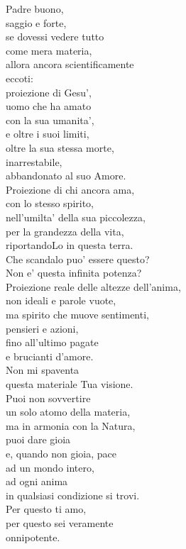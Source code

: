 \begin{haiku}
Padre buono,\\
saggio e forte,\\
se dovessi vedere tutto \\
come mera materia,\\
    allora ancora scientificamente\\
    eccoti:\\
    proiezione di Gesu',\\
uomo che ha amato\\
con la sua umanita',\\
e oltre i suoi limiti,\\
oltre la sua stessa morte,\\
inarrestabile,\\
abbandonato al suo Amore.\\
Proiezione di chi ancora ama,\\
con lo stesso spirito,\\
nell'umilta' della sua piccolezza,\\
per la grandezza della vita,\\
riportandoLo in questa terra.\\
Che scandalo puo' essere questo?\\
Non e' questa infinita potenza?\\
Proiezione reale delle altezze dell'anima,\\
non ideali e parole vuote,\\
ma spirito che muove sentimenti, \\
pensieri e azioni,\\
fino all'ultimo pagate\\
e brucianti d'amore.\\
Non mi spaventa \\
    questa materiale Tua visione.\\
Puoi non sovvertire \\
    un solo atomo della materia,\\
ma in armonia con la Natura,\\
    puoi dare gioia \\
    e, quando non gioia, pace\\
ad un mondo intero, \\
    ad ogni anima\\
in qualsiasi condizione si trovi.\\
Per questo ti amo,\\
per questo sei veramente \\
    onnipotente.\\
\end{haiku}

